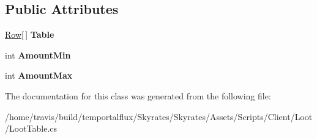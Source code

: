 \subsection*{Public Attributes}
\begin{DoxyCompactItemize}
\item 
\hypertarget{class_skyrates_1_1_client_1_1_loot_1_1_loot_table_a51353bf82a01b769b9b0174a22e008c0}{\hyperlink{class_skyrates_1_1_client_1_1_loot_1_1_loot_table_1_1_row}{Row}\mbox{[}$\,$\mbox{]} {\bfseries Table}}\label{class_skyrates_1_1_client_1_1_loot_1_1_loot_table_a51353bf82a01b769b9b0174a22e008c0}

\item 
\hypertarget{class_skyrates_1_1_client_1_1_loot_1_1_loot_table_ab20cb118131a30a72bd812c4362b4b1b}{int {\bfseries Amount\-Min}}\label{class_skyrates_1_1_client_1_1_loot_1_1_loot_table_ab20cb118131a30a72bd812c4362b4b1b}

\item 
\hypertarget{class_skyrates_1_1_client_1_1_loot_1_1_loot_table_a03d5cd741cb0ebf92a7eceb54904e87d}{int {\bfseries Amount\-Max}}\label{class_skyrates_1_1_client_1_1_loot_1_1_loot_table_a03d5cd741cb0ebf92a7eceb54904e87d}

\end{DoxyCompactItemize}


The documentation for this class was generated from the following file\-:\begin{DoxyCompactItemize}
\item 
/home/travis/build/temportalflux/\-Skyrates/\-Skyrates/\-Assets/\-Scripts/\-Client/\-Loot/Loot\-Table.\-cs\end{DoxyCompactItemize}
